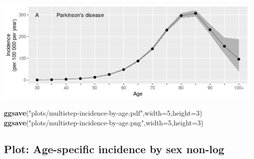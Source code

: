 \documentclass[
]{article}
\newenvironment{Shaded}{\begin{snugshade}}{\end{snugshade}}
\newcommand{\DataTypeTok}[1]{\textcolor[rgb]{0.13,0.29,0.53}{#1}}
\newcommand{\DecValTok}[1]{\textcolor[rgb]{0.00,0.00,0.81}{#1}}
\newcommand{\KeywordTok}[1]{\textcolor[rgb]{0.13,0.29,0.53}{\textbf{#1}}}
\newcommand{\NormalTok}[1]{#1}
\newcommand{\StringTok}[1]{\textcolor[rgb]{0.31,0.60,0.02}{#1}}
\begin{document}
\includegraphics{multistep-model-comparison_files/figure-latex/age-specific-incidence-figure-1.png}

\begin{Shaded}
\begin{Highlighting}[]
\KeywordTok{ggsave}\NormalTok{(}\StringTok{"plots/multistep-incidence-by-age.pdf"}\NormalTok{,}\DataTypeTok{width=}\DecValTok{5}\NormalTok{,}\DataTypeTok{height=}\DecValTok{3}\NormalTok{)}
\KeywordTok{ggsave}\NormalTok{(}\StringTok{"plots/multistep-incidence-by-age.png"}\NormalTok{,}\DataTypeTok{width=}\DecValTok{5}\NormalTok{,}\DataTypeTok{height=}\DecValTok{3}\NormalTok{)}
\end{Highlighting}
\end{Shaded}

\hypertarget{plot-age-specific-incidence-by-sex-non-log}{%
\subsection{Plot: Age-specific incidence by sex
non-log}\label{plot-age-specific-incidence-by-sex-non-log}}
\end{document}

